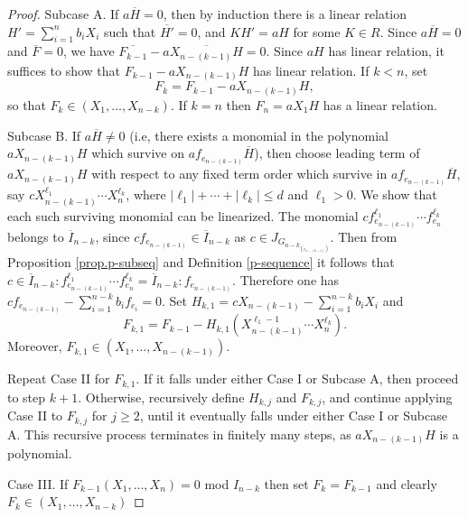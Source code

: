 \documentclass[11pt,a4paper,reqno]{amsart}
\theoremstyle{definition}
\begin{document}
\begin{proof}
   
    \vspace{2mm}
    
    Subcase A. If $a\overline{H}=0$, then by induction there is a linear relation $H'= \sum_{i=1}^nb_iX_i$ such that $\overline{H'}=0$, and $KH' = aH$ for some $K \in R$.
    Since $a\overline{H}=0$ and $\overline{F}=0$, we have $\overline{F_{k-1}}-a\overline{X_{n-(k-1)}H}=0$. Since $aH$ has linear relation, it suffices to show that  $F_{k-1}-a{X_{n-(k-1)}H}$ has linear relation. If $k<n$, set $$F_k=F_{k-1}-a{X_{n-(k-1)}H},$$ so that $F_k\in (X_1,\ldots,X_{n-k})$.  If $k=n$ then $F_n=a{X_{1}H}$ has a linear relation.
   
    \vspace{2mm}
    
    Subcase B. If $a\overline{H}\neq 0$ (i.e, there exists a monomial in the polynomial $aX_{n-(k-1)}H$ which survive on  $af_{e_{n-(k-1)}}\overline{H}$), then choose leading term of $aX_{n-(k-1)}H$ with respect to any fixed term order which survive in $af_{e_{n-(k-1)}}\overline{H}$, say $cX_{n-(k-1)}^{\ell_1}\cdots X_n^{\ell_k}$, where $\lvert \ell_1 \rvert + \cdots + \lvert \ell_k \rvert \leq d$ and $\ell_1 >0$. We show that each such surviving monomial can be linearized. The monomial $cf_{e_{n-(k-1)}}^{\ell_1}\cdots f_{e_{n}}^{\ell_k}$ belongs to $\overline{I}_{n-k}$, since $cf_{e_{n-(k-1)}} \in \overline{I}_{n-k}$ as $c \in J_{G_{n-k_{(e_{n-(k-1)})}}}$. Then from Proposition \ref{prop.p-subseq} and Definition \ref{p-sequence} it follows that $c \in \overline{I}_{n-k}:f_{e_{n-(k-1)}}^{\ell_1}\cdots f_{e_{n}}^{\ell_k} = \overline{I}_{n-k}:f_{e_{n-(k-1)}}$. Therefore one has $cf_{e_{n-(k-1)}}-\sum_{i=1}^{n-k}b_if_{e_i} = 0$. Set $H_{k,1}=cX_{n-(k-1)}-\sum_{i=1}^{n-k}b_iX_i$ and $$F_{k,1}= F_{k-1}-H_{k,1}(X_{n-(k-1)}^{\ell_1-1}\cdots X_n^{\ell_k}).$$ Moreover, $F_{k,1} \in (X_1,\ldots,X_{n-(k-1)})$.
    
    Repeat Case II for $F_{k,1}$. If it falls under either Case I or Subcase A, then proceed to step $k+1$. Otherwise, recursively define  $H_{k,j}$ and $F_{k,j}$, and continue applying Case II to $F_{k,j}$ for $j\geq 2$, until it eventually falls under either Case I or Subcase A. This recursive process terminates in finitely many steps, as $aX_{n-(k-1)}H$ is a polynomial. 
    
    \vspace{2mm}
    
    Case III. If $F_{k-1}(X_1,\ldots,X_n) = 0$ mod $I_{n-k}$ then set $F_k=F_{k-1}$ and clearly  $F_k\in (X_1,\ldots,X_{n-k})$


\end{proof}
\end{document}
